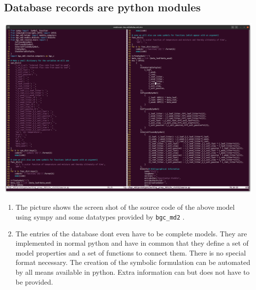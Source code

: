 \documentclass[36pt]{article}
\begin{document}
\begin{tcbposter}
{  \subsection*{Database records are python modules}
  \includegraphics[width=\columnwidth]{source.py.png}
  \begin{enumerate}
    \item
    The picture shows the screen shot of the source code of the above model using sympy and some datatypes provided by \texttt{bgc\_md2}  .
    \item
    The entries of the database dont even have to be complete models. They are implemented in normal python and 
    have in common that they define a set of model properties and a set of functions to connect them.
    There is no special format necessary. 
    The creation of the symbolic formulation can be automated by all means available in python.
    Extra information can but does not have to be provided.
  \end{enumerate}
}
\end{tcbposter}
\end{document}
